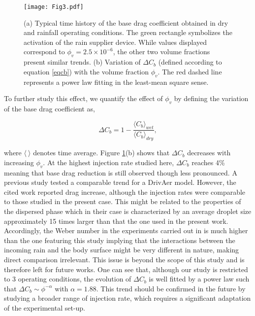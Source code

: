 \documentclass[doublecol]{epl2}
\begin{document}
\begin{figure}
\centering
\texttt{[image: Fig3.pdf]}
\caption{(a) Typical time history of the base drag coefficient obtained in dry and rainfall operating conditions. The green rectangle symbolizes the activation of the rain supplier device. While values displayed correspond to $\phi_v = 2.5\times10^{-6}$, the other two volume fractions present similar trends. (b) Variation of $\Delta C_b$ (defined according to equation \ref{eqcb}) with the volume fraction $\phi_v$. The red dashed line represents a power law fitting in the least-mean square sense.}
\label{fig3}
\end{figure}

\noindent To further study this effect, we quantify the effect of $\phi_v$ by defining the variation of the base drag coefficient as,

 \begin{equation}\label{eqcb}
 \Delta C_b = 1- \frac{\langle C_b \rangle_{wet}}{\langle C_b \rangle_{dry}},
 \end{equation}

\noindent where $\langle \: \rangle$ denotes time average. Figure \ref{fig3}(b) shows that $\Delta C_b$ decreases with increasing $\phi_v$. At the highest injection rate studied here, $\Delta C_b$ reaches 4\% meaning that base drag reduction is still observed though less pronounced. A previous study \cite{raeesi2023} tested a comparable trend for a DrivAer model. However, the cited work reported drag increase, although the injection rates were comparable to those studied in the present case. This might be related to the properties of the dispersed phase which in their case is characterized by an average droplet size approximately 15 times larger than that the one used in the present work. Accordingly, the Weber number in the experiments carried out in \cite{raeesi2023} is much higher than the one featuring this study implying that the interactions between the incoming rain and the body surface might be very different in nature, making direct comparison irrelevant. This issue is beyond the scope of this study and is therefore left for future works. One can see that, although our study is restricted to 3 operating conditions, the evolution of $\Delta C_b$ is well fitted by a power law such that $\Delta C_b \sim \phi^{-\alpha}$ with $\alpha=1.88$. This trend should be confirmed in the future by studying a broader range of injection rate, which requires a significant adaptation of the experimental set-up.
\end{document}
